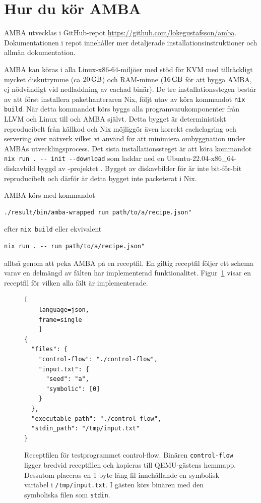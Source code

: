 \section{Hur du kör AMBA}\label{sec:run-amba}

AMBA utvecklas i GitHub-repot \url{https://github.com/lokegustafsson/amba}.
Dokumentationen i repot innehåller mer detaljerade installationsinstruktioner
och allmän dokumentation.

AMBA kan köras i alla Linux-x86-64-miljöer med stöd för KVM med tillräckligt
mycket diskutrymme (ca $\SI{20}{\giga\byte}$) och RAM-minne
($\SI{16}{\giga\byte}$ för att bygga AMBA, ej nödvändigt vid nedladdning av
cachad binär). De tre installationsstegen består av att först installera
pakethanteraren Nix, följt utav av köra kommandot \lstinline{nix build}.  När
detta kommandot körs byggs alla programvarukomponenter från LLVM och Linux till
\stoe{} och AMBA självt. Detta bygget är deterministiskt reproducibelt från
källkod och Nix möjliggör även korrekt cachelagring och servering över nätverk
vilket vi använd för att minimiera ombyggnation under AMBAs utvecklingsprocess.
Det sista installationssteget är att köra kommandot
\lstinline{nix run . -- init --download}
som laddar ned en Ubuntu-22.04-x86\_64-diskavbild byggd av \stoe{}-projektet
. Bygget av diskavbilder för \stoe{} är inte bit-för-bit reproducibelt
och därför är detta bygget inte packeterat i Nix.

AMBA körs med kommandot
\begin{verbatim}
./result/bin/amba-wrapped run path/to/a/recipe.json"
\end{verbatim}
efter \lstinline{nix build} eller ekvivalent
\begin{verbatim}
nix run . -- run path/to/a/recipe.json"
\end{verbatim}
alltså genom att peka AMBA på en receptfil. En giltig receptfil följer ett
schema varav en delmängd av fälten har implementerad funktionalitet.
Figur~\ref{fig:recipe} visar en receptfil för vilken alla fält är
implementerade.

\begin{figure}
    \begin{lstlisting}[
    language=json,
    frame=single
    ]
{
  "files": {
    "control-flow": "./control-flow",
    "input.txt": {
      "seed": "a",
      "symbolic": [0]
    }
  },
  "executable_path": "./control-flow",
  "stdin_path": "/tmp/input.txt"
}
\end{lstlisting}

    \caption{
        Receptfilen för testprogrammet control-flow. Binären
        \texttt{control-flow} ligger bredvid receptfilen och kopieras till
        QEMU-gästens hemmapp. Dessutom placeras en 1 byte lång fil innehållande en
        symbolisk variabel i \texttt{/tmp/input.txt}. I gästen körs binären med den
        symboliska filen som \texttt{stdin}.
    }\label{fig:recipe}

\end{figure}

